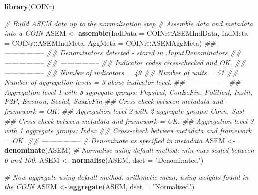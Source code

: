 \documentclass[
]{book}
\newenvironment{Shaded}{\begin{snugshade}}{\end{snugshade}}
\newcommand{\CommentTok}[1]{\textcolor[rgb]{0.56,0.35,0.01}{\textit{#1}}}
\newcommand{\DataTypeTok}[1]{\textcolor[rgb]{0.13,0.29,0.53}{#1}}
\newcommand{\KeywordTok}[1]{\textcolor[rgb]{0.13,0.29,0.53}{\textbf{#1}}}
\newcommand{\NormalTok}[1]{#1}
\newcommand{\OperatorTok}[1]{\textcolor[rgb]{0.81,0.36,0.00}{\textbf{#1}}}
\newcommand{\StringTok}[1]{\textcolor[rgb]{0.31,0.60,0.02}{#1}}
\begin{document}
\begin{Shaded}
\begin{Highlighting}[]
\KeywordTok{library}\NormalTok{(COINr)}

\CommentTok{# Build ASEM data up to the normalisation step}
\CommentTok{# Assemble data and metadata into a COIN}
\NormalTok{ASEM <-}\StringTok{ }\KeywordTok{assemble}\NormalTok{(}\DataTypeTok{IndData =}\NormalTok{ COINr}\OperatorTok{::}\NormalTok{ASEMIndData, }\DataTypeTok{IndMeta =}\NormalTok{ COINr}\OperatorTok{::}\NormalTok{ASEMIndMeta, }\DataTypeTok{AggMeta =}\NormalTok{ COINr}\OperatorTok{::}\NormalTok{ASEMAggMeta)}
\CommentTok{## -----------------}
\CommentTok{## Denominators detected - stored in .$Input$Denominators}
\CommentTok{## -----------------}
\CommentTok{## -----------------}
\CommentTok{## Indicator codes cross-checked and OK.}
\CommentTok{## -----------------}
\CommentTok{## Number of indicators = 49}
\CommentTok{## Number of units = 51}
\CommentTok{## Number of aggregation levels = 3 above indicator level.}
\CommentTok{## -----------------}
\CommentTok{## Aggregation level 1 with 8 aggregate groups: Physical, ConEcFin, Political, Instit, P2P, Environ, Social, SusEcFin}
\CommentTok{## Cross-check between metadata and framework = OK.}
\CommentTok{## Aggregation level 2 with 2 aggregate groups: Conn, Sust}
\CommentTok{## Cross-check between metadata and framework = OK.}
\CommentTok{## Aggregation level 3 with 1 aggregate groups: Index}
\CommentTok{## Cross-check between metadata and framework = OK.}
\CommentTok{## -----------------}
\CommentTok{# Denominate as specified in metadata}
\NormalTok{ASEM <-}\StringTok{ }\KeywordTok{denominate}\NormalTok{(ASEM)}
\CommentTok{# Normalise using default method: min-max scaled between 0 and 100.}
\NormalTok{ASEM <-}\StringTok{ }\KeywordTok{normalise}\NormalTok{(ASEM, }\DataTypeTok{dset =} \StringTok{"Denominated"}\NormalTok{)}

\CommentTok{# Now aggregate using default method: arithmetic mean, using weights found in the COIN}
\NormalTok{ASEM <-}\StringTok{ }\KeywordTok{aggregate}\NormalTok{(ASEM, }\DataTypeTok{dset =} \StringTok{"Normalised"}\NormalTok{)}


\end{Highlighting}
\end{Shaded}
\end{document}
